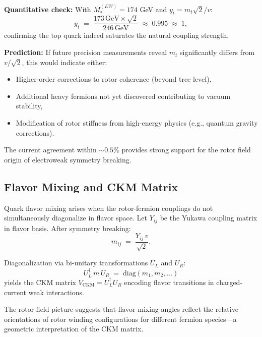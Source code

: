 \documentclass[11pt,a4paper]{article}
\theoremstyle{definition}
\theoremstyle{plain}
\theoremstyle{remark}
\begin{document}
\textbf{Quantitative check:} With $M_*^{(EW)} = 174$ GeV and $y_t = m_t\sqrt{2}/v$:
\begin{equation}
y_t \;=\; \frac{173\,\text{GeV} \times \sqrt{2}}{246\,\text{GeV}} \;\approx\; 0.995 \;\approx\; 1,
\end{equation}
confirming the top quark indeed saturates the natural coupling strength.

\textbf{Prediction:} If future precision measurements reveal $m_t$ significantly differs from $v/\sqrt{2}$, this would indicate either:
\begin{itemize}[leftmargin=*,itemsep=3pt]
  \item Higher-order corrections to rotor coherence (beyond tree level),
  \item Additional heavy fermions not yet discovered contributing to vacuum stability,
  \item Modification of rotor stiffness from high-energy physics (e.g., quantum gravity corrections).
\end{itemize}

The current agreement within $\sim 0.5\%$ provides strong support for the rotor field origin of electroweak symmetry breaking.

\subsection{Flavor Mixing and CKM Matrix}

Quark flavor mixing arises when the rotor-fermion couplings do not simultaneously diagonalize in flavor space. Let $Y_{ij}$ be the Yukawa coupling matrix in flavor basis. After symmetry breaking:
\begin{equation}
  m_{ij} \;=\; \frac{Y_{ij}\,v}{\sqrt{2}}.
\end{equation}

Diagonalization via bi-unitary transformations $U_L$ and $U_R$:
\begin{equation}
  U_L^\dagger\, m\, U_R \;=\; \mathrm{diag}(m_1, m_2, \ldots)
\end{equation}
yields the CKM matrix $V_{\text{CKM}} = U_L^\dagger U_R$ encoding flavor transitions in charged-current weak interactions.

The rotor field picture suggests that flavor mixing angles reflect the relative orientations of rotor winding configurations for different fermion species---a geometric interpretation of the CKM matrix.

\vspace{1em}
\end{document}
